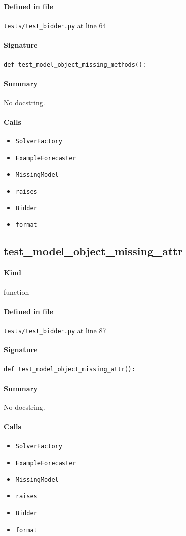 \documentclass[11pt]{report}
\begin{document}
\paragraph{Defined in file} \texttt{tests/test\_bidder.py} at line 64
\paragraph{Signature} \texttt{def test\_model\_object\_missing\_methods():}
\paragraph{Summary} No docstring.
\paragraph{Calls}
\begin{itemize}[leftmargin=*]
  \item \texttt{SolverFactory}
  \item \hyperref[def:tests-util.py:ExampleForecaster:L259]{\texttt{ExampleForecaster}}
  \item \texttt{MissingModel}
  \item \texttt{raises}
  \item \hyperref[def:bidder.py:Bidder:L1000]{\texttt{Bidder}}
  \item \texttt{format}
\end{itemize}
\subsection{test\_model\_object\_missing\_attr}
\label{def:tests-test_bidder.py:test_model_object_missing_attr:L87}
\paragraph{Kind} function
\paragraph{Defined in file} \texttt{tests/test\_bidder.py} at line 87
\paragraph{Signature} \texttt{def test\_model\_object\_missing\_attr():}
\paragraph{Summary} No docstring.
\paragraph{Calls}
\begin{itemize}[leftmargin=*]
  \item \texttt{SolverFactory}
  \item \hyperref[def:tests-util.py:ExampleForecaster:L259]{\texttt{ExampleForecaster}}
  \item \texttt{MissingModel}
  \item \texttt{raises}
  \item \hyperref[def:bidder.py:Bidder:L1000]{\texttt{Bidder}}
  \item \texttt{format}
\end{itemize}
\end{document}
